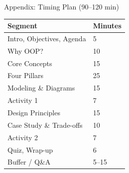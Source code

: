 \documentclass[aspectratio=169,11pt]{beamer}
\begin{document}
\begin{frame}{Appendix: Timing Plan (90–120 min)}
\small
\begin{tabular}{@{}ll@{}}
\toprule
Segment & Minutes \\
\midrule
Intro, Objectives, Agenda & 5 \\
Why OOP? & 10 \\
Core Concepts & 15 \\
Four Pillars & 25 \\
Modeling \& Diagrams & 15 \\
Activity 1 & 7 \\
Design Principles & 15 \\
Case Study \& Trade-offs & 10 \\
Activity 2 & 7 \\
Quiz, Wrap-up & 6 \\
Buffer / Q\&A & 5--15 \\
\bottomrule
\end{tabular}
\end{frame}
\end{document}
